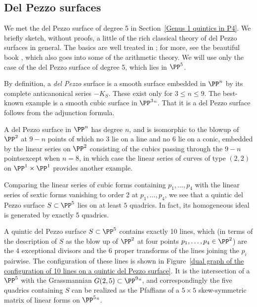 \subsection{Del Pezzo surfaces}\label{Del Pezzo sketch}

We  met the del Pezzo surface of degree 5 in Section~\ref{Genus 1 quintics
in P4}.
We briefly sketch, without proofs, a little of the
 rich classical theory of del Pezzo surfaces in general. The basics are
 well treated in \cite[pp.~45--50]{Beauville}; for more, see the
beautiful book \cite{Manin}, which also goes into some of the arithmetic
%
%
theory. We will use only the case of the del Pezzo surface of degree 5,
which lies in $\PP^{5}$.

By definition,
a \emph{del Pezzo} surface is a smooth surface embedded in $\PP^n$  by
%
its complete anticanonical series $-K_S$. These exist only for $3\leq
n\leq 9$. The best-known example is a smooth cubic surface in $\PP^3``$.
%
%
That it is a del Pezzo surface follows from the adjunction formula.

A del Pezzo surface in $\PP^n$ has degree $n$, and is isomorphic to the
blowup of $\PP^2$ at $9-n$ points of which no 3 lie on a line and no
6 lie on a conic, embedded by the linear series on $\PP^2$
consisting of the cubics passing through the $9-n$ points\emdash except
when $n=8$, in which case the
linear series of curves of type $(2,2)$ on $\PP^1\times \PP^1$ provides
another example.

Comparing the linear series  of cubic forms containing $p_1,\dots,p_4$
with the linear series  of sextic forms vanishing to order 2 at
$p_1,\dots,p_4$, we see that a quintic del Pezzo surface $S \subset \PP^5$
lies on at least $5$ quadrics. In fact, its homogeneous ideal is generated
by exactly 5 quadrics.

A quintic del Pezzo surface $S \subset \PP^5$ contains exactly 10 lines,
which (in terms of the description of $S$ as the blow up of $\PP^2$ at
four points $p_1,\dots,p_4 \in \PP^2$) are the 4 exceptional divisors
and the 6 proper transforms of the lines joining the $p_i$ pairwise. The
configuration of these lines is shown in Figure~\ref{dual graph of the
configuration of 10 lines on a quintic del Pezzo surface}.
It is the intersection of a $\PP^5$ with the Grassmannian $G(2,5)
\subset \PP^9` `$, and correspondingly the five quadrics containing $S$
can be realized as the Pfaffians of a  $5\times 5$ skew-symmetric matrix
of linear forms on $\PP^5` `$.

